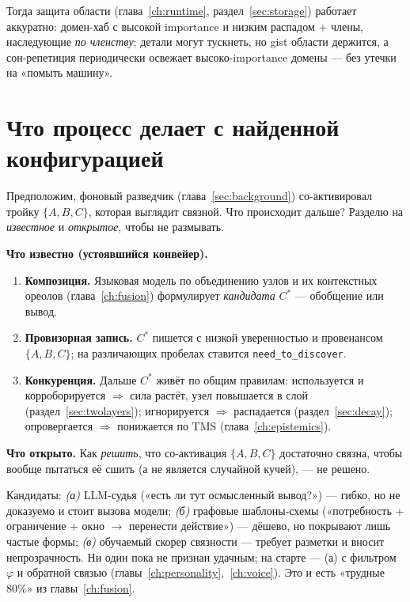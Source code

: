 Тогда защита области (глава~\ref{ch:runtime}, раздел~\ref{sec:storage})
работает аккуратно: домен-хаб с высокой importance и низким распадом + члены,
наследующие \emph{по членству}; детали могут тускнеть, но gist области
держится, а сон-репетиция периодически освежает высоко-importance домены ---
без утечки на «помыть машину».

\section{Что процесс делает с найденной конфигурацией}
\label{sec:whatfusiondoes}

Предположим, фоновый разведчик (глава~\ref{sec:background}) со-активировал
тройку $\{A, B, C\}$, которая выглядит связной. Что происходит дальше? Разделю
на \emph{известное} и \emph{открытое}, чтобы не размывать.

\smallskip\noindent\textbf{Что известно (устоявшийся конвейер).}
\begin{enumerate}
\item \textbf{Композиция.} Языковая модель по объединению узлов и их
контекстных ореолов (глава~\ref{ch:fusion}) формулирует \emph{кандидата}
$C^\ast$ --- обобщение или вывод.
\item \textbf{Провизорная запись.} $C^\ast$ пишется с низкой уверенностью и
провенансом $\{A, B, C\}$; на различающих пробелах ставится
\texttt{need\_to\_discover}.
\item \textbf{Конкуренция.} Дальше $C^\ast$ живёт по общим правилам:
используется и корроборируется $\Rightarrow$ сила растёт, узел повышается в
слой (раздел~\ref{sec:twolayers}); игнорируется $\Rightarrow$ распадается
(раздел~\ref{sec:decay}); опровергается $\Rightarrow$ понижается по TMS
(глава~\ref{ch:epistemics}).
\end{enumerate}

\smallskip\noindent\textbf{Что открыто.}
Как \emph{решить}, что со-активация $\{A, B, C\}$ достаточно связна, чтобы
вообще пытаться её сшить (а не является случайной кучей), --- не решено.

\begin{openq}
Кандидаты: \emph{(а)} LLM-судья («есть ли тут осмысленный вывод?») --- гибко,
но не доказуемо и стоит вызова модели; \emph{(б)} графовые шаблоны-схемы
(«потребность + ограничение + окно $\to$ перенести действие») --- дёшево, но
покрывают лишь частые формы; \emph{(в)} обучаемый скорер связности --- требует
разметки и вносит непрозрачность. Ни один пока не признан удачным; на старте
--- (а) с фильтром $\varphi$ и обратной связью
(главы~\ref{ch:personality},~\ref{ch:voice}). Это и есть «трудные 80\%» из
главы~\ref{ch:fusion}.
\end{openq}

